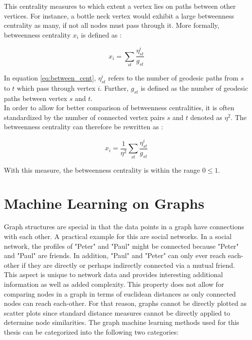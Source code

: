 	\noindent This centrality measures to which extent a vertex lies on paths 
	between other vertices. For instance, a bottle neck vertex would exhibit a 
	large betweenness centrality as many, if not all nodes must pass through it. 
	More formally, betweenness centrality $x_i$ is defined as 
	\citep[p. 187]{Newman2010}:

	\begin{equation}
		x_i = \sum_{st} \frac{\eta_{st}^i}{g_{st}}
		\label{eq:between_cent}
	\end{equation}

	\noindent In equation \ref{eq:between_cent}, $\eta_{st}^i$ refers to the 
	number of geodesic paths from $s$ to $t$ which pass through vertex $i$. 
	Further, $g_{st}$ is defined as the number of geodesic paths between vertex 
	$s$ and $t$. \\

	\noindent In order to allow for better comparison of betweenness
	centralities, it is often standardized by the number of connected vertex
	pairs $s$ and $t$ denoted as  $\eta^2$. The betweenness centrality
	can therefore be rewritten as \citep[p.190]{Newman2010}:

	\begin{equation}
		x_i = \frac{1}{\eta^2}\sum_{st} \frac{\eta_{st}^i}{g_{st}}
	\end{equation}

	\noindent With this measure, the betweenness centrality is within the range
	$0\leqslant1$.

	\section{Machine Learning on Graphs}

	\noindent Graph structures are special in that the data points in a graph 
	have connections with each other. A practical example for this are social 
	networks. In a social network, the profiles of "Peter" and "Paul" might be 
	connected because "Peter" and "Paul" are friends. In addition, "Paul" and 
	"Peter" can only ever reach each-other if they are directly or perhaps 
	indirectly connected via a mutual friend. This aspect is unique to network 
	data and provides interesting additional information as well as added
	complexity. This property does not allow for comparing nodes in a graph in 
	terms of euclidean distances as only connected nodes can reach each-other.
	For that reason, graphs cannot be directly plotted as scatter plots since
	standard distance measures cannot be directly applied to determine node 
	similarities. The graph machine learning methods used for this thesis can 
	be categorized into the following two categories:

